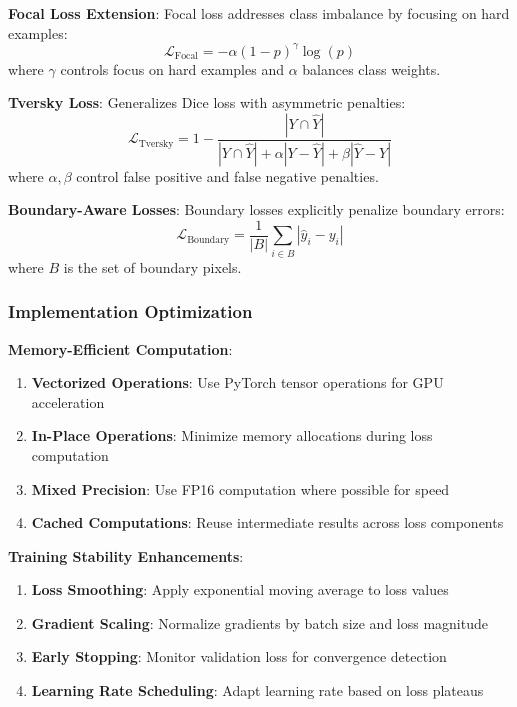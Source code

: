 \documentclass[12pt,a4paper]{article}
\begin{document}
\textbf{Focal Loss Extension}:
Focal loss addresses class imbalance by focusing on hard examples:
\begin{equation}
\mathcal{L}_{\text{Focal}} = -\alpha (1 - p)^\gamma \log(p)
\end{equation}
where $\gamma$ controls focus on hard examples and $\alpha$ balances class weights.

\textbf{Tversky Loss}:
Generalizes Dice loss with asymmetric penalties:
\begin{equation}
\mathcal{L}_{\text{Tversky}} = 1 - \frac{|Y \cap \hat{Y}|}{|Y \cap \hat{Y}| + \alpha |Y - \hat{Y}| + \beta |\hat{Y} - Y|}
\end{equation}
where $\alpha, \beta$ control false positive and false negative penalties.

\textbf{Boundary-Aware Losses}:
Boundary losses explicitly penalize boundary errors:
\begin{equation}
\mathcal{L}_{\text{Boundary}} = \frac{1}{|B|} \sum_{i \in B} |\hat{y}_i - y_i|
\end{equation}
where $B$ is the set of boundary pixels.

\subsubsection{Implementation Optimization}

\textbf{Memory-Efficient Computation}:
\begin{enumerate}
    \item \textbf{Vectorized Operations}: Use PyTorch tensor operations for GPU acceleration
    \item \textbf{In-Place Operations}: Minimize memory allocations during loss computation
    \item \textbf{Mixed Precision}: Use FP16 computation where possible for speed
    \item \textbf{Cached Computations}: Reuse intermediate results across loss components
\end{enumerate}

\textbf{Training Stability Enhancements}:
\begin{enumerate}
    \item \textbf{Loss Smoothing}: Apply exponential moving average to loss values
    \item \textbf{Gradient Scaling}: Normalize gradients by batch size and loss magnitude
    \item \textbf{Early Stopping}: Monitor validation loss for convergence detection
    \item \textbf{Learning Rate Scheduling}: Adapt learning rate based on loss plateaus
\end{enumerate}
\end{document}
